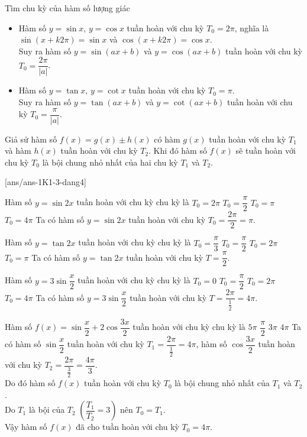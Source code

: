\begin{dang}{Tìm chu kỳ của hàm số lượng giác}
	\begin{itemize}
		\item Hàm số $y=\sin x$, $y=\cos x$ tuần hoàn với chu kỳ $T_0=2\pi$, nghĩa là $\sin(x+k2\pi)=\sin x$ và $\cos(x+k2\pi)=\cos x$.\\
		Suy ra hàm số $y=\sin(ax+b)$ và $y=\cos(ax+b)$ tuần hoàn với chu kỳ $T_0=\dfrac{2\pi}{|a|}$.
		\item Hàm số $y=\tan x$, $y=\cot x$ tuần hoàn với chu kỳ $T_0=\pi$.\\
		Suy ra hàm số $y=\tan(ax+b)$ và $y=\cot(ax+b)$ tuần hoàn với chu kỳ $T_0=\dfrac{\pi}{|a|}$.
	\end{itemize}
	\begin{note}
		Giả sử hàm số $f(x)=g(x)\pm h(x)$ có hàm $g(x)$ tuần hoàn với chu kỳ $T_1$ và hàm $h(x)$ tuần hoàn với chu kỳ $T_2$. Khi đó hàm số $f(x)$ sẽ tuần hoàn với chu kỳ $T_0$ là bội chung nhỏ nhất của hai chu kỳ $T_1$ và $T_2$.
	\end{note}
\end{dang}
\setcounter{ex}{0}
[ans/ans-1K1-3-dang4]
\begin{ex}%
	Hàm số $y=\sin 2x$ tuần hoàn với chu kỳ chu kỳ là
	\choice
	{$T_0=2\pi$}
	{$T_0=\dfrac{\pi}{2}$}
	{\True $T_0=\pi$}
	{$T_0=4\pi$}
	\loigiai
	{
		Ta có hàm số $y=\sin 2x$ tuần hoàn với chu kỳ $T_0=\dfrac{2\pi}{2}=\pi$.
	}
\end{ex}
\begin{ex}%
	Hàm số $y=\tan 2x$ tuần hoàn với chu kỳ chu kỳ là
	\choice
	{$T_0=\dfrac{\pi}{3}$}
	{\True $T_0=\dfrac{\pi}{2}$}
	{$T_0=2\pi$}
	{$T_0=\pi$}
	\loigiai
	{
		Ta có hàm số $y=\tan 2x$ tuần hoàn với chu kỳ $T=\dfrac{\pi}{2}$.
	}
\end{ex}
\begin{ex}%
	Hàm số $y=3\sin\dfrac{x}{2}$ tuần hoàn với chu kỳ chu kỳ là
	\choice
	{$T_0=0$}
	{$T_0=\dfrac{\pi}{2}$}
	{$T_0=2\pi$}
	{\True $T_0=4\pi$}
	\loigiai
	{
		Ta có hàm số $y=3\sin\dfrac{x}{2}$ tuần hoàn với chu kỳ $T=\dfrac{2\pi}{\tfrac{1}{2}}=4\pi$.
	}
\end{ex}
\begin{ex}%
	Hàm số $f(x)=\sin\dfrac{x}{2}+2\cos\dfrac{3x}{2}$ tuần hoàn với chu kỳ chu kỳ là
	\choice
	{$5\pi$}
	{$\dfrac{\pi}{2}$}
	{$3\pi$}
	{\True $4\pi$}
	\loigiai
	{
		Ta có hàm số $\sin\dfrac{x}{2}$ tuần hoàn với chu kỳ $T_1=\dfrac{2\pi}{\tfrac{1}{2}}=4\pi$, hàm số $\cos\dfrac{3x}{2}$ tuần hoàn với chu kỳ $T_2=\dfrac{2\pi}{\tfrac{3}{2}}=\dfrac{4\pi}{3}$.\\
		Do đó hàm số $f(x)$ tuần hoàn với chu kỳ $T_0$ là bội chung nhỏ nhất của $T_1$ và $T_2$.\\
		Do $T_1$ là bội của $T_2$ $\left(\dfrac{T_1}{T_2}=3\right)$ nên $T_0=T_1$.\\
		Vậy hàm số $f(x)$ đã cho tuần hoàn với chu kỳ $T_0=4\pi$.
	}
\end{ex}
